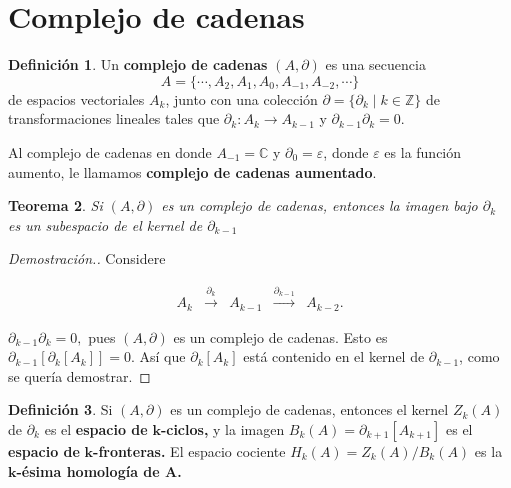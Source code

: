 \documentclass[12pt]{book}
\newtheorem{theorem}{Teorema}[section]
\theoremstyle{definition}
\newtheorem{definition}[theorem]{Definición}
\newcounter{in}
\newcounter{ini}
\begin{document}
\section{Complejo de cadenas}

\begin{definition}
  Un \textbf{complejo de cadenas} $(A,\partial)$ es una secuencia
  $$A=\{\cdots,A_{2},A_{1},A_{0},A_{-1},A_{-2},\cdots\}$$
  de espacios vectoriales $A_{k}$, junto con una colección
  $\partial=\{\partial_{k}\mid k \in \mathbb{Z}\}$ de transformaciones
  lineales tales que $\partial_{k}:A_{k}\rightarrow A_{k-1}$ y
  $\partial_{k-1}\partial_{k}=0.$

  Al complejo de cadenas en donde $A_{-1}=\mathbb{C}$ y $\partial_{0}=\varepsilon$,
  donde $\varepsilon$ es la función aumento, le llamamos \textbf{complejo de cadenas aumentado}.
\end{definition}

\begin{theorem}
  Si $(A,\partial)$ es un complejo de cadenas, entonces la imagen bajo
  $\partial_{k}$ es un subespacio de el kernel de $\partial_{k-1}$
\end{theorem}
\begin{proof}[Demostración.]
  Considere
  \begin{small}
    \[
    \begin{array}{ccccc}
      A_{k} & \stackrel{\partial_{k}}{\longrightarrow} & A_{k-1} &
      \stackrel{\partial_{k-1}}{\longrightarrow} & A_{k-2}.
    \end{array} 
    \]
  \end{small}
  $\partial_{k-1}\partial_{k}=0,$ pues $(A,\partial)$ es un complejo
  de cadenas. Esto es $\partial_{k-1}[\partial_{k}[A_{k}]]=0.$ Así que
  $\partial_{k}[A_{k}]$ está contenido en el kernel de
  $\partial_{k-1}$, como se quería demostrar.
\end{proof}

\begin{definition}
  Si $(A,\partial)$ es un complejo de cadenas, entonces el kernel
  $Z_{k}(A)$ de $\partial_{k}$ es el\textbf{ espacio de} $\boldsymbol{k}$\textbf{-ciclos,} y
  la imagen $B_{k}(A)=\partial_{k+1}[A_{k+1}]$ es el \textbf{espacio
    de} $\boldsymbol{k}$\textbf{-fronteras.} El espacio cociente $H_{k}(A)=Z_{k}(A)/B_{k}(A)$
  es la $\boldsymbol{k}$\textbf{-ésima homología de A.}
\end{definition}
\end{document}
